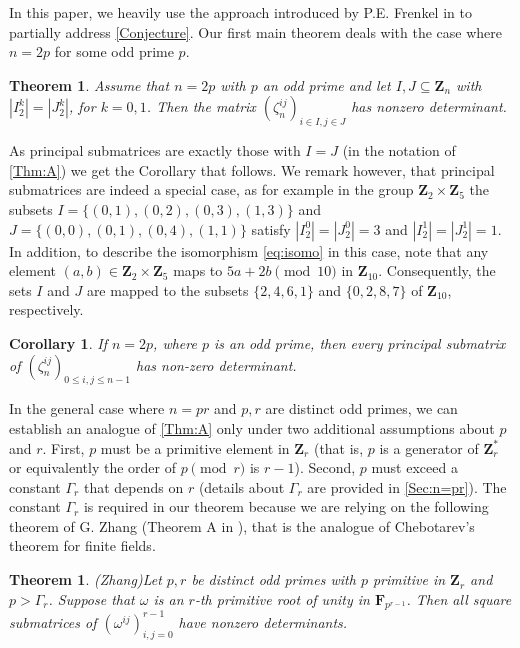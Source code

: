 \documentclass[10pt,a4paper]{amsart}
\newtheorem{prevtheorem}{Theorem}
\newtheorem{theorem}{Theorem}
\newtheorem{corollary}{Corollary}
\def\Z{\mathbf{Z}}
\def\F{\mathbf{F}}
\begin{document}
In this paper, we heavily use the approach introduced by P.E. Frenkel in \cite{Frenkel}  to partially address \autoref{Conjecture}.  Our first main theorem deals with  the case where \( n=2p \) for some odd prime \( p \).
\begin{prevtheorem}\label{Thm:A}
 Assume that $n=2p$ with $p$ an odd prime and  let   $I, J \subseteq \Z_{n}$ with $|I_2^k| = |J_2^k|$, for  $k=0,1$.  Then the matrix $(\zeta_{n}^{ij})_{i \in I, j\in J}$ has nonzero determinant.    
\end{prevtheorem}

As principal  submatrices  are exactly those with $I = J$ (in the notation of \autoref{Thm:A}) we get the Corollary that follows. We remark however,  that 
principal submatrices are indeed a special case, as for example in the group $\Z_2 \times \Z_5$ 
the subsets 
$I = \{ (0,1), (0,2), (0,3), (1,3)\}$ and $J=\{ (0,0), (0,1), (0,4), (1,1)\}$ satisfy $|I_2^0| = |J_2^0|=3$ and $|I_2^1| = |J_2^1|=1$. In addition, to describe the isomorphism \eqref{eq:isomo} in this case, note that any element $(a,b) \in \Z_2 \times \Z_5$ maps to $5a +2b \pmod{10}$ in $\Z_{10}$. Consequently, the sets $I$ and $J$ are mapped to the subsets $\{2,4,6,1\}$ and $\{0,2,8,7\}$ of $\Z_{10}$, respectively.
\begin{corollary}\label{Cor:n=2p}
If  $n=2p$,  where $p$ is an odd prime, then every  principal submatrix of $(\zeta_n^{ij})_{0 \leq i,j\leq n-1}$ has non-zero determinant.
\end{corollary}



In the general case where \( n = pr \) and \( p, r \) are distinct odd primes, we can establish an analogue of \autoref{Thm:A} only under two additional assumptions about \( p \) and \( r \). First, \( p \) must be a primitive element in \( \Z_r \) (that is, $p$ is a generator of $\Z_r^*$ or equivalently the order of $p \pmod r$ is $r-1$).  Second, \( p \) must exceed a constant \( \Gamma_r \) that depends on \( r \) (details about \( \Gamma_r \) are provided in \autoref{Sec:n=pr}). 
The constant $\Gamma_r$ is required in our theorem  because we are relying on  the following theorem of G. Zhang (Theorem A in \cite{Zhang}),   that is the analogue of Chebotarev's theorem for finite fields.   
\begin{theorem}(Zhang)\label{Zhang}
    Let $p, r$ be distinct odd primes with $p$ primitive  in  $\Z_r$ and $p > \Gamma_r$.  Suppose that  $\omega$ is an $r$-th  primitive root of unity in $\F_{p^{r-1}}$. Then all square submatrices of $(\omega^{ij})_{i,j= 0}^{r-1}$  have nonzero determinants. 
\end{theorem}
\end{document}
